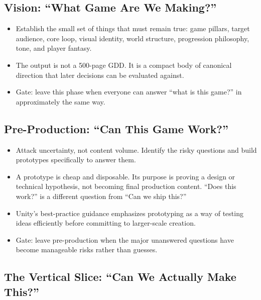 \documentclass[
  11pt,
  letterpaper,
  DIV=11,
  numbers=noendperiod,
  twoside,
  open=right]{scrreprt}
\providecommand{\tightlist}{%
  \setlength{\itemsep}{0pt}\setlength{\parskip}{0pt}}
\begin{document}
\subsection{Vision: ``What Game Are We
Making?''}\label{vision-what-game-are-we-making}

\begin{itemize}
\tightlist
\item
  Establish the small set of things that must remain true: game pillars,
  target audience, core loop, visual identity, world structure,
  progression philosophy, tone, and player fantasy.
\item
  The output is not a 500-page GDD. It is a compact body of canonical
  direction that later decisions can be evaluated against.
\item
  Gate: leave this phase when everyone can answer ``what is this game?''
  in approximately the same way.
\end{itemize}

\subsection{Pre-Production: ``Can This Game
Work?''}\label{pre-production-can-this-game-work}

\begin{itemize}
\tightlist
\item
  Attack uncertainty, not content volume. Identify the risky questions
  and build prototypes specifically to answer them.
\item
  A prototype is cheap and disposable. Its purpose is proving a design
  or technical hypothesis, not becoming final production content. ``Does
  this work?'' is a different question from ``Can we ship this?''
\item
  Unity's best-practice guidance emphasizes prototyping as a way of
  testing ideas efficiently before committing to larger-scale creation.
\item
  Gate: leave pre-production when the major unanswered questions have
  become manageable risks rather than guesses.
\end{itemize}

\subsection{The Vertical Slice: ``Can We Actually Make
This?''}\label{the-vertical-slice-can-we-actually-make-this}
\end{document}
